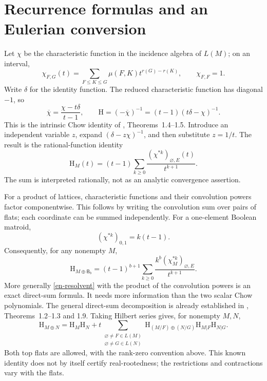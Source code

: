 \documentclass[12pt]{amsart}
\theoremstyle{definition}
\theoremstyle{remark}
\numberwithin{equation}{section}
\newcommand{\HCh}{\mathrm{H}}
\newcommand{\Bmat}{\mathsf{B}}
\begin{document}
\section{Recurrence formulas and an Eulerian conversion}
Let $\chi$ be the characteristic function in the incidence algebra of $L(M)$; on an interval,
\[
 \chi_{F,G}(t)=\sum_{F\leq K\leq G}\mu(F,K)t^{r(G)-r(K)},\qquad \chi_{F,F}=1.
\]
Write $\delta$ for the identity function. The reduced characteristic function has diagonal $-1$, so
\[
 \overline\chi=\frac{\chi-t\delta}{t-1},\qquad
 \HCh=(-\overline\chi)^{-1}=(t-1)(t\delta-\chi)^{-1}.
\]
This is the intrinsic Chow identity of \cite{FMSV24}, Theorems~1.4--1.5. Introduce an independent variable $z$, expand $(\delta-z\chi)^{-1}$, and then substitute $z=1/t$. The result is the rational-function identity
\begin{equation}\label{en-resolvent}
 \HCh_M(t)=(t-1)\sum_{k\geq0}\frac{(\chi^{*k})_{\varnothing,E}(t)}{t^{k+1}}.
\end{equation}
The sum is interpreted rationally, not as an analytic convergence assertion.

For a product of lattices, characteristic functions and their convolution powers factor componentwise. This follows by writing the convolution sum over pairs of flats; each coordinate can be summed independently. For a one-element Boolean matroid,
\[
 (\chi^{*k})_{0,1}=k(t-1).
\]
Consequently, for any nonempty $M$,
\begin{equation}\label{en-coloop-resolvent}
 \HCh_{M\oplus\Bmat_b}
 =(t-1)^{b+1}\sum_{k\geq0}
 \frac{k^b(\chi_M^{*k})_{\varnothing,E}}{t^{k+1}}.
\end{equation}
More generally \eqref{en-resolvent} with the product of the convolution powers is an exact direct-sum formula. It needs more information than the two scalar Chow polynomials.
The general direct-sum decomposition is already established in \cite{Pie25}, Theorems~1.2--1.3 and 1.9. Taking Hilbert series gives, for nonempty $M,N$,
\begin{equation}\label{en-known-directsum}
 \HCh_{M\oplus N}=\HCh_M\HCh_N+
 t\sum_{\substack{\varnothing\ne F\in L(M)\\\varnothing\ne G\in L(N)}}
 \HCh_{(M/F)\oplus(N/G)}\HCh_{M|F}\HCh_{N|G}.
\end{equation}
Both top flats are allowed, with the rank-zero convention above. This known identity does not by itself certify real-rootedness; the restrictions and contractions vary with the flats.
\end{document}

